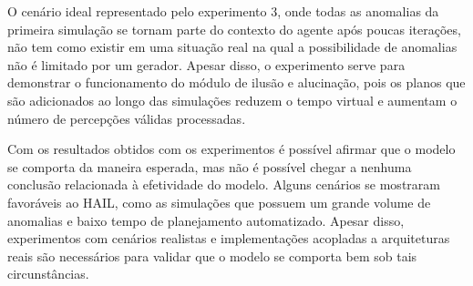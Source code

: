 O cenário ideal representado pelo experimento 3, onde todas as anomalias da primeira simulação se tornam parte do contexto do agente após poucas iterações, não tem como existir em uma situação real na qual a possibilidade de anomalias não é limitado por um gerador. Apesar disso, o experimento serve para demonstrar o funcionamento do módulo de ilusão e alucinação, pois os planos que são adicionados ao longo das simulações reduzem o tempo virtual e aumentam o número de percepções válidas processadas.

Com os resultados obtidos com os experimentos é possível afirmar que o modelo se comporta da maneira esperada, mas não é possível chegar a nenhuma conclusão relacionada à efetividade do modelo. Alguns cenários se mostraram favoráveis ao HAIL, como as simulações que possuem um grande volume de anomalias e baixo tempo de planejamento automatizado. Apesar disso, experimentos com cenários realistas e implementações acopladas a arquiteturas reais são necessários para validar que o modelo se comporta bem sob tais circunstâncias.